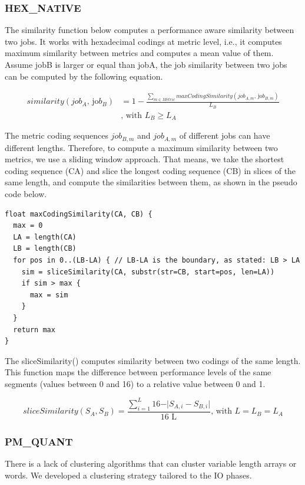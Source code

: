 \documentclass[]{llncs}
\begin{document}
\subsubsection{HEX\_NATIVE}
The similarity function below computes a performance aware similarity between two jobs.
It works with hexadecimal codings at metric level, i.e., it computes maximum similarity between metrics and computes a mean value of them.
Assume jobB is larger or equal than jobA, the job similarity between two jobs can be computed by the following equation.

\begin{align}
similarity \left( job_{A}\text{, jo}b_{B} \right) &= 1-\frac{ \sum _{m \in Metric}^{}maxCodingSimilarity \left( job_{A,m}\text{, jo}b_{B,m} \right) }{L_{B}}\\
&\text{, with }L_{B} \geq L_{A}
\end{align}

The metric coding sequences $job_{B,m}$ and $job_{A,m}$ of different jobs can have different lengths.
Therefore, to compute a maximum similarity between two metrics, we use a sliding window approach.
That means, we take the shortest coding sequence (CA) and slice the longest coding sequence (CB) in slices of the same length, and compute the similarities between them, as shown in the pseudo code below.

\begin{lstlisting}
float maxCodingSimilarity(CA, CB) { 
  max = 0
  LA = length(CA)
  LB = length(CB)
  for pos in 0..(LB-LA) { // LB-LA is the boundary, as stated: LB > LA
    sim = sliceSimilarity(CA, substr(str=CB, start=pos, len=LA))
    if sim > max {
      max = sim
    }
  }
  return max
}
\end{lstlisting}

The sliceSimilarity() computes similarity between two codings of the same length.
This function maps the difference between performance levels of the same segments (values between 0 and 16) to a relative value between 0 and 1.

\begin{equation}
sliceSimilarity \left( S_{A},S_{B} \right) =\frac{ \sum _{i=1}^{L_{}}16 - \vert S_{A,i}-S_{B,i} \vert }{\text{16 L}_{}}\text{, with }L=L_{B}=L_{A}
\end{equation}

\subsubsection{PM\_QUANT}
There is a lack of clustering algorithms that can cluster variable length arrays or words.
We developed a clustering strategy tailored to the IO phases.
\end{document}
